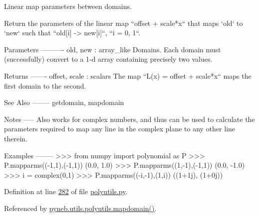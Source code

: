 \begin{DoxyVerb}Linear map parameters between domains.

Return the parameters of the linear map ``offset + scale*x`` that maps
`old` to `new` such that ``old[i] -> new[i]``, ``i = 0, 1``.

Parameters
----------
old, new : array_like
    Domains. Each domain must (successfully) convert to a 1-d array
    containing precisely two values.

Returns
-------
offset, scale : scalars
    The map ``L(x) = offset + scale*x`` maps the first domain to the
    second.

See Also
--------
getdomain, mapdomain

Notes
-----
Also works for complex numbers, and thus can be used to calculate the
parameters required to map any line in the complex plane to any other
line therein.

Examples
--------
>>> from numpy import polynomial as P
>>> P.mapparms((-1,1),(-1,1))
(0.0, 1.0)
>>> P.mapparms((1,-1),(-1,1))
(0.0, -1.0)
>>> i = complex(0,1)
>>> P.mapparms((-i,-1),(1,i))
((1+1j), (1+0j))\end{DoxyVerb}
 

Definition at line \hyperlink{polyutils_8py_source_l00282}{282} of file \hyperlink{polyutils_8py_source}{polyutils.\-py}.



Referenced by \hyperlink{polyutils_8py_source_l00329}{pyneb.\-utils.\-polyutils.\-mapdomain()}.


